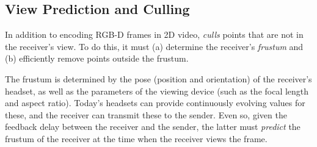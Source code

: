









\subsection{View Prediction and Culling}
\label{ss:view-prediction-and-culling}

In addition to encoding RGB-D frames in 2D video, \livo{} \textit{culls} points that are not in the receiver's view.
%
To do this, it must (a) determine the receiver's \textit{frustum} and (b) efficiently remove points outside the frustum.

%
The frustum is determined by the pose (position and orientation) of the receiver's headset, as well as the parameters of the viewing device (such as the focal length and aspect ratio).
%
Today's headsets can provide continuously evolving values for these, and the receiver can transmit these to the sender.
%
Even so, given the feedback delay between the receiver and the sender, the latter must \textit{predict} the frustum of the receiver at the time when the receiver views the frame.

